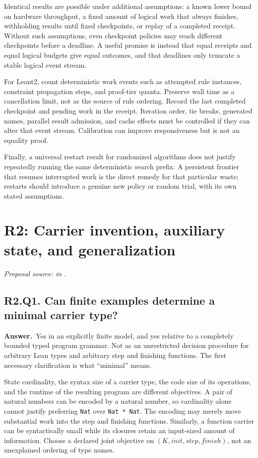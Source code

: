 \documentclass[11pt,a4paper]{article}
\theoremstyle{definition}
\theoremstyle{remark}
\newcommand{\code}[1]{\texttt{#1}}
\newcommand{\answer}{\par\noindent\textbf{Answer.}\ }
\newcommand{\sourcepart}[1]{\par\noindent\textit{Proposal source: #1 in \cite{proposal}.}}
\newcommand{\qheading}[2]{\subsection{#1. #2}}
\begin{document}
Identical results are possible under additional assumptions: a known lower
bound on hardware throughput, a fixed amount of logical work that always
finishes, withholding results until fixed checkpoints, or replay of a completed
receipt. Without such assumptions, even checkpoint policies may reach different
checkpoints before a deadline. A useful promise is instead that equal receipts
and equal logical budgets give equal outcomes, and that deadlines only truncate
a stable logical event stream.

For Leant2, count deterministic work events such as attempted rule instances,
constraint propagation steps, and proof-tier quanta. Preserve wall time as a
cancellation limit, not as the source of rule ordering. Record the last
completed checkpoint and pending work in the receipt. Iteration order, tie
breaks, generated names, parallel result admission, and cache effects must be
controlled if they can alter that event stream. Calibration can improve
responsiveness but is not an equality proof.

Finally, a universal restart result for randomized algorithms does not justify
repeatedly running the same deterministic search prefix. A persistent frontier
that resumes interrupted work is the direct remedy for that particular waste;
restarts should introduce a genuine new policy or random trial, with its own
stated assumptions.

\section{R2: Carrier invention, auxiliary state, and generalization}
\label{sec:r2}
\sourcepart{}

\qheading{R2.Q1}{Can finite examples determine a minimal carrier type?}
\answer Yes in an explicitly finite model, and yes relative to a completely
bounded typed program grammar. Not as an unrestricted decision procedure for
arbitrary Lean types and arbitrary step and finishing functions. The first
necessary clarification is what ``minimal'' means.

State cardinality, the syntax size of a carrier type, the code size of its
operations, and the runtime of the resulting program are different objectives.
A pair of natural numbers can be encoded by a natural number, so cardinality
alone cannot justify preferring \code{Nat} over \code{Nat * Nat}. The encoding
may merely move substantial work into the step and finishing functions.
Similarly, a function carrier can be syntactically small while its closures
retain an input-sized amount of information. Choose a declared joint objective
on $(K,\mathit{init},\mathit{step},\mathit{finish})$, not an unexplained ordering
of type names.
\end{document}
